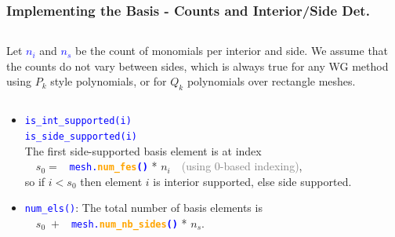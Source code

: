 \documentclass[compress]{beamer}
\begin{document}
\begin{frame}
  \frametitle{Implementing the Basis - Counts and Interior/Side Det.}
  \begin{columns}
      \small
      Let \textcolor{blue}{\large $n_i$} and \textcolor{blue}{\large $n_s$} be the count of monomials per interior and side.
      {\scriptsize We assume that the counts do not vary between sides, which is always true for any WG method using
      $P_k$ style polynomials, or for $Q_k$ polynomials over rectangle meshes.}
  \end{columns}
  \begin{itemize}[<+->]
    \item {\texttt{\textcolor{blue}{is\_int\_supported(i)\\ is\_side\_supported(i)}}}\\
      The first side-supported basis element is at index\\
      $\quad s_0 = $ {\texttt{\textcolor{blue}{ mesh.\textbf{\textcolor{orange}{num\_fes}()}}} * $n_i\quad$}\textcolor{gray}{(using 0-based indexing)},\\
      so if $i < s_0$ then element $i$ is interior supported, else side supported.
    \item {\texttt{\textcolor{blue}{num\_els()}}}: The total number of basis elements is\\
        $\quad s_0 \;+ $ {\texttt{\textcolor{blue}{ mesh.\textbf{\textcolor{orange}{num\_nb\_sides}()}}} * $n_s$}.
  \end{itemize}
\end{frame}
\end{document}
